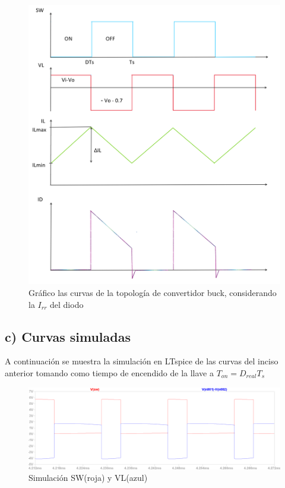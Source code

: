 \documentclass[e4_tp1_main.tex]{subfiles}
\begin{document}
\begin{figure}[H]
  \centering
    \includegraphics[scale = 0.6]{Imagenes/punto2/Dibujo}
  \caption{Gr\'afico las curvas de la topolog\'ia de convertidor buck, considerando la $I_{rr}$ del diodo}
  \label{fig:dibujo}
\end{figure}


\subsection*{c) Curvas simuladas}

A continuaci\'on se muestra la simulaci\'on en LTspice de las curvas del inciso anterior tomando como tiempo de encendido de la llave a $T_{on}=D_{real}T_s$


\begin{figure}[H]
  \centering
    \includegraphics[scale = 0.6]{Imagenes/punto2/SW&VL}
  \caption{Simulaci\'on SW(roja) y VL(azul)}
  \label{fig:SW&VL}
\end{figure}
\end{document}

